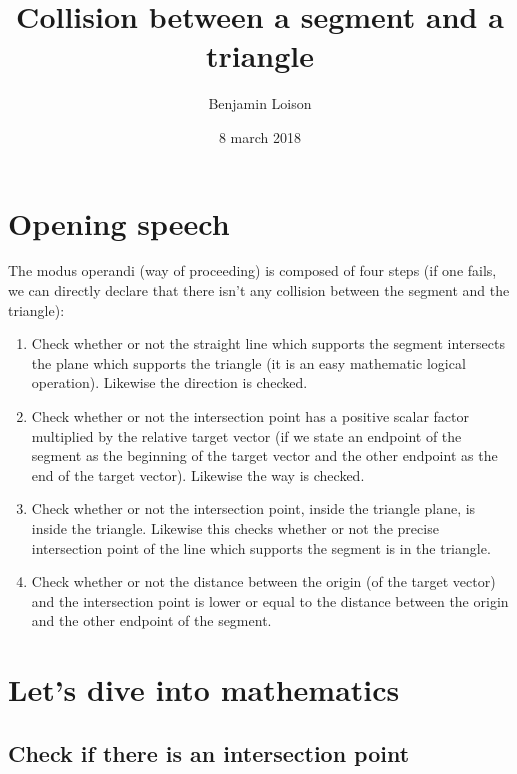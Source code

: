 \documentclass{article}
\begin{document}
    \title{Collision between a segment and a triangle}
    \author{Benjamin Loison}
    \date{8 march 2018}
    \maketitle

    \tableofcontents
    \clearpage

    \section{Opening speech}

    	The modus operandi (way of proceeding) is composed of four steps (if one fails, we can directly declare that there isn't any collision between the segment and the triangle):\\
    	
    	\begin{enumerate}

    	    \item Check whether or not the straight line which supports the segment intersects the plane which supports the triangle (it is an easy mathematic logical operation). Likewise the direction is checked.
    	    \item Check whether or not the intersection point has a positive scalar factor multiplied by the relative target vector (if we state an endpoint of the segment as the beginning of the target vector and the other endpoint as the end of the target vector). Likewise the way is checked.
    	  \item Check whether or not the intersection point, inside the triangle plane, is inside the triangle. Likewise this checks whether or not the precise intersection point of the line which supports the segment is in the triangle.
    	    \item Check whether or not the distance between the origin (of the target vector) and the intersection point is lower or equal to the distance between the origin and the other endpoint of the segment.
    	    
    	\end{enumerate}
    	
    \section{Let's dive into mathematics}
    	
     \subsection{Check if there is an intersection point}
    
\end{document}
